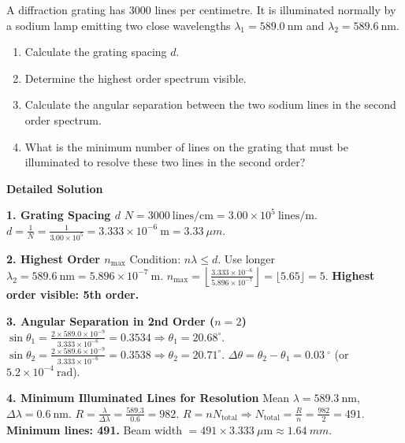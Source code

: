 \documentclass[11pt]{article}
\begin{document}
\begin{exoresolu}
A diffraction grating has $3000$ lines per centimetre. It is illuminated normally by a sodium lamp emitting two close wavelengths $\lambda_1 = 589.0\ \mathrm{nm}$ and $\lambda_2 = 589.6\ \mathrm{nm}$.
\begin{enumerate}
\item Calculate the grating spacing $d$.
\item Determine the highest order spectrum visible.
\item Calculate the angular separation between the two sodium lines in the second order spectrum.
\item What is the minimum number of lines on the grating that must be illuminated to resolve these two lines in the second order?
\end{enumerate}
\tcblower
\textbf{Detailed Solution}

\textbf{1. Grating Spacing $d$}
$N = 3000\ \mathrm{lines/cm} = 3.00 \times 10^5\ \mathrm{lines/m}$.
$d = \frac{1}{N} = \frac{1}{3.00 \times 10^5} = 3.333 \times 10^{-6}\ \mathrm{m} = \SI{3.33}{\mu m}$.

\textbf{2. Highest Order $n_{\max}$}
Condition: $n\lambda \le d$. Use longer $\lambda_2 = 589.6\ \mathrm{nm} = 5.896 \times 10^{-7}\ \mathrm{m}$.
$n_{\max} = \left\lfloor \frac{3.333 \times 10^{-6}}{5.896 \times 10^{-7}} \right\rfloor = \lfloor 5.65 \rfloor = 5$.
\textbf{Highest order visible: 5th order.}

\textbf{3. Angular Separation in 2nd Order ($n=2$)}
$\sin\theta_1 = \frac{2 \times 589.0 \times 10^{-9}}{3.333 \times 10^{-6}} = 0.3534 \Rightarrow \theta_1 = 20.68^\circ$.
$\sin\theta_2 = \frac{2 \times 589.6 \times 10^{-9}}{3.333 \times 10^{-6}} = 0.3538 \Rightarrow \theta_2 = 20.71^\circ$.
$\Delta\theta = \theta_2 - \theta_1 = \SI{0.03}{\ensuremath{{}^{\circ}}}$ (or $5.2 \times 10^{-4}\ \mathrm{rad}$).

\textbf{4. Minimum Illuminated Lines for Resolution}
Mean $\lambda = 589.3\ \mathrm{nm}$, $\Delta\lambda = 0.6\ \mathrm{nm}$.
$R = \frac{\lambda}{\Delta\lambda} = \frac{589.3}{0.6} = 982$.
$R = n N_{\text{total}} \Rightarrow N_{\text{total}} = \frac{R}{n} = \frac{982}{2} = 491$.
\textbf{Minimum lines: 491.} Beam width $= 491 \times 3.333\ \mu\mathrm{m} \approx \SI{1.64}{mm}$.
\end{exoresolu}
\end{document}
